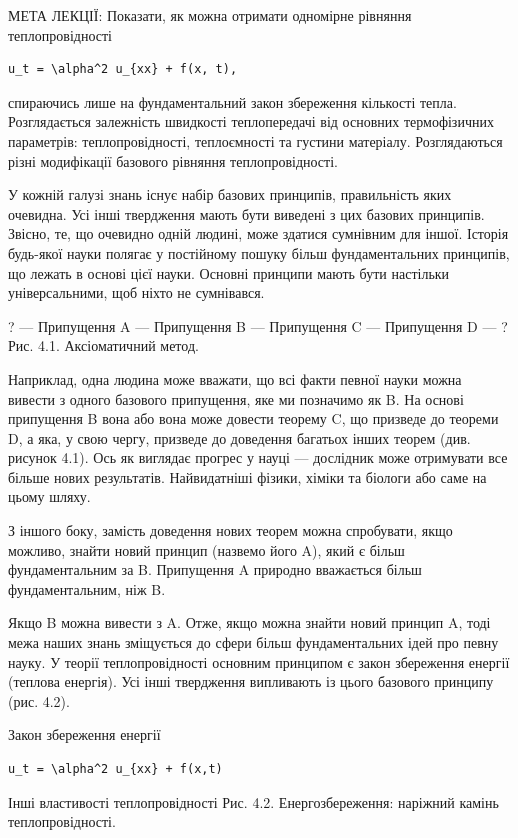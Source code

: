 \documentclass[
  ukrainian,
]{article}
\begin{document}
МЕТА ЛЕКЦІЇ: Показати, як можна отримати одномірне рівняння
теплопровідності

\begin{verbatim}
u_t = \alpha^2 u_{xx} + f(x, t),
\end{verbatim}

спираючись лише на фундаментальний закон збереження кількості тепла.
Розглядається залежність швидкості теплопередачі від основних
термофізичних параметрів: теплопровідності, теплоємності та густини
матеріалу. Розглядаються різні модифікації базового рівняння
теплопровідності.

У кожній галузі знань існує набір базових принципів, правильність яких
очевидна. Усі інші твердження мають бути виведені з цих базових
принципів. Звісно, те, що очевидно одній людині, може здатися сумнівним
для іншої. Історія будь-якої науки полягає у постійному пошуку більш
фундаментальних принципів, що лежать в основі цієї науки. Основні
принципи мають бути настільки універсальними, щоб ніхто не сумнівався.

? --- Припущення A --- Припущення B --- Припущення C --- Припущення D
--- ? Рис. 4.1. Аксіоматичний метод.

Наприклад, одна людина може вважати, що всі факти певної науки можна
вивести з одного базового припущення, яке ми позначимо як B. На основі
припущення B вона або вона може довести теорему C, що призведе до
теореми D, а яка, у свою чергу, призведе до доведення багатьох інших
теорем (див. рисунок 4.1). Ось як виглядає прогрес у науці --- дослідник
може отримувати все більше нових результатів. Найвидатніші фізики,
хіміки та біологи або саме на цьому шляху.

З іншого боку, замість доведення нових теорем можна спробувати, якщо
можливо, знайти новий принцип (назвемо його A), який є більш
фундаментальним за B. Припущення A природно вважається більш
фундаментальним, ніж B.

Якщо B можна вивести з A. Отже, якщо можна знайти новий принцип A, тоді
межа наших знань зміщується до сфери більш фундаментальних ідей про
певну науку. У теорії теплопровідності основним принципом є закон
збереження енергії (теплова енергія). Усі інші твердження випливають із
цього базового принципу (рис. 4.2).

Закон збереження енергії

\begin{verbatim}
u_t = \alpha^2 u_{xx} + f(x,t)
\end{verbatim}

Інші властивості теплопровідності Рис. 4.2. Енергозбереження: наріжний
камінь теплопровідності.
\end{document}
